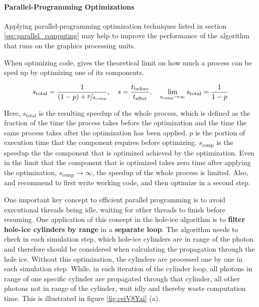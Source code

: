 \paragraph{Parallel-Programming Optimizations}
Applying parallel-programming optimization techniques listed in section \ref{sec:parallel_computing} may help to improve the performance of the algorithm that runs on the graphics processing units.

When optimizing code,  gives the theoretical limit on how much a process can be sped up by optimizing one of its components. \cite{raytracingtips}

$$ s_\text{total} = \frac{1}{(1 - p) + \sfrac{p}{s_\text{comp}}}, \ \ \ s = \frac{t_\text{before}}{t_\text{after}}, \ \ \
\lim_{s_\text{comp}\rightarrow\infty} s_\text{total} = \frac{1}{1-p} $$

Here, $s_\text{total}$ is the resulting speedup of the whole process, which is defined as the fraction of the time the process takes before the optimization and the time the same process takes after the optimization has been applied. $p$ is the portion of execution time that the component requires before optimizing. $s_\text{comp}$ is the speedup the the component that is optimized achieved by the optimization.
Even in the limit that the component that is optimized takes zero time after applying the optimization, $s_\text{comp}\rightarrow\infty$, the speedup of the whole process is limited.
Also, \authorname{House} and \authorname{Wyman} \cite{raytracingtips} recommend to first write working code, and then optimize in a second step.

One important key concept to efficient parallel programming is to avoid executional threads being idle, waiting for other threads to finish before resuming.
One application of this concept in the hole-ice algorithm is to \textbf{filter hole-ice cylinders by range} in a \textbf{separate loop}.
The algorithm needs to check in each simulation step, which hole-ice cylinders are in range of the photon and therefore should be considered when calculating the propagation through the hole ice. Without this optimization, the cylinders are processed one by one in each simulation step. While, in each iteration of the cylinder loop, all photons in range of one specific cylinder are propagated through that cylinder, all other photons not in range of the cylinder, wait idly and thereby waste computation time. This is illustrated in figure \ref{fig:ceiV8Yai} (a).

